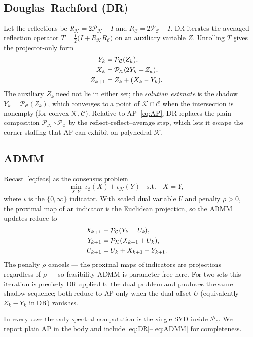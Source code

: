 \documentclass[journal]{IEEEtran}
\newcommand{\proj}{\mathcal{P}}
\newcommand{\Kset}{\mathcal{K}}
\newcommand{\Cset}{\mathcal{C}}
\begin{document}
\subsection{Douglas--Rachford (DR)}
Let the reflections be $R_\Kset = 2\proj_\Kset - I$ and
$R_\Cset = 2\proj_\Cset - I$. DR iterates the averaged reflection
operator $T=\tfrac12\bigl(I+R_\Kset R_\Cset\bigr)$ on an auxiliary
variable $Z$. Unrolling $T$ gives the projector-only form
\begin{align}
Y_k     &= \proj_\Cset(Z_k), \notag\\
X_k     &= \proj_\Kset(2Y_k - Z_k), \label{eq:DR}\\
Z_{k+1} &= Z_k + (X_k - Y_k). \notag
\end{align}
The auxiliary $Z_k$ need not lie in either set; the \emph{solution
estimate} is the shadow $Y_k=\proj_\Cset(Z_k)$, which converges to a
point of $\Kset\cap\Cset$ when the intersection is nonempty (for convex
$\Kset,\Cset$). Relative to AP~\eqref{eq:AP}, DR replaces the plain
composition $\proj_\Kset\circ\proj_\Cset$ by the reflect--reflect--average
step, which lets it escape the corner stalling that AP can exhibit on
polyhedral $\Kset$.

\subsection{ADMM}
Recast~\eqref{eq:feas} as the consensus problem
\[
\min_{X,Y}\ \iota_\Cset(X) + \iota_\Kset(Y)
\quad \text{s.t.}\quad X=Y,
\]
where $\iota$ is the $\{0,\infty\}$ indicator. With scaled dual variable
$U$ and penalty $\rho>0$, the proximal map of an indicator is the
Euclidean projection, so the ADMM updates reduce to
\begin{align}
X_{k+1} &= \proj_\Cset(Y_k - U_k), \notag\\
Y_{k+1} &= \proj_\Kset(X_{k+1} + U_k), \label{eq:ADMM}\\
U_{k+1} &= U_k + X_{k+1} - Y_{k+1}. \notag
\end{align}
The penalty $\rho$ cancels --- the proximal maps of indicators are
projections regardless of $\rho$ --- so feasibility ADMM is
parameter-free here. For two sets this iteration is precisely DR applied
to the dual problem and produces the same shadow sequence; both reduce to
AP only when the dual offset $U$ (equivalently $Z_k-Y_k$ in DR) vanishes.

In every case the only spectral computation is the single SVD inside
$\proj_\Cset$. We report plain AP in the body and include
\eqref{eq:DR}--\eqref{eq:ADMM} for completeness.



\end{document}
